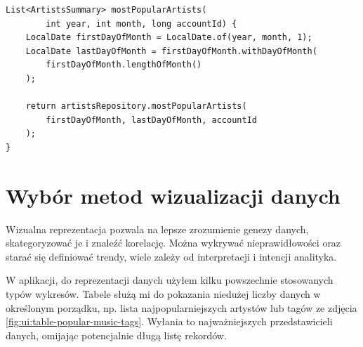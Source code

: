 \documentclass[openright]{xmgr}
\begin{document}
    \begin{verbatim}
List<ArtistsSummary> mostPopularArtists(
        int year, int month, long accountId) {
    LocalDate firstDayOfMonth = LocalDate.of(year, month, 1);
    LocalDate lastDayOfMonth = firstDayOfMonth.withDayOfMonth(
        firstDayOfMonth.lengthOfMonth()
    );

    return artistsRepository.mostPopularArtists(
        firstDayOfMonth, lastDayOfMonth, accountId
    );
}
    \end{verbatim}

    \section{Wybór metod wizualizacji danych}

    Wizualna reprezentacja pozwala na lepsze zrozumienie genezy danych, skategoryzować je i znaleźć korelację.
    Można wykrywać nieprawidłowości oraz starać się definiować trendy, wiele zależy od interpretacji i intencji analityka.
    \cite{charts:excel-comparsion}

    W aplikacji, do reprezentacji danych użyłem kilku powszechnie stosowanych typów wykresów.
    Tabele służą mi do pokazania niedużej liczby danych w określonym porządku,
    np. lista najpopularniejszych artystów lub tagów ze zdjęcia \ref{fig:ui:table-popular-music-tags}.
    Wyłania to najważniejszych przedstawicieli danych, omijając potencjalnie długą listę rekordów.
\end{document}
